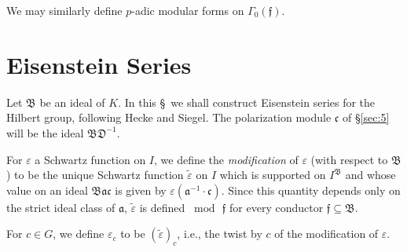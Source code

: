 \documentclass[12pt,a4paper]{article}
\theoremstyle{plain}
\theoremstyle{definition}
\theoremstyle{remark}
\begin{document}
We may similarly define $p$-adic modular forms on $\Gamma_0(\mathfrak{f})$.


\section{Eisenstein Series}\label{sec:6}

Let $\mathfrak{B}$ be an ideal of $K$. In this \S\ we shall construct Eisenstein series for the Hilbert group, following Hecke and Siegel. The polarization module $\mathfrak{c}$ of \S\ref{sec:5} will be the ideal $\mathfrak{B}\mathfrak{D}^{-1}$.

For $\varepsilon$ a Schwartz function on $I$, we define the \emph{modification} of $\varepsilon$ (with respect to $\mathfrak{B}$) to be the unique Schwartz function $\tilde{\varepsilon}$ on $I$ which is supported on $I^\mathfrak{B}$ and whose value on an ideal $\mathfrak{B}\mathfrak{a}\mathfrak{c}$ is given by $\varepsilon(\mathfrak{a}^{-1} \cdot \mathfrak{c})$. Since this quantity depends only on the strict ideal class of $\mathfrak{a}$, $\tilde{\varepsilon}$ is defined $\bmod\, \mathfrak{f}$ for every conductor $\mathfrak{f} \subseteq \mathfrak{B}$.

For $c \in G$, we define $\varepsilon_c$ to be $(\tilde{\varepsilon})_c$, i.e., the twist by $c$ of the modification of $\varepsilon$.
\end{document}
